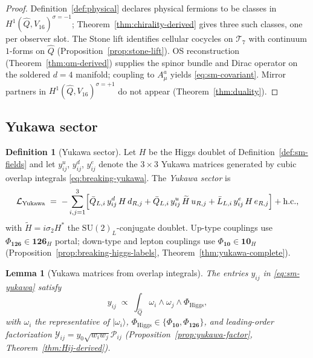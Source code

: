 \documentclass[11pt]{article}
\theoremstyle{plain}
\newtheorem{lemma}[theorem]{Lemma}
\theoremstyle{definition}
\newtheorem{definition}[theorem]{Definition}
\theoremstyle{remark}
\numberwithin{equation}{section}
\begin{document}
\begin{proof}
Definition~\ref{def:physical} declares physical fermions to be classes in
$H^1(\hat Q,V_{16})^{\sigma=-1}$; Theorem~\ref{thm:chirality-derived} gives
three such classes, one per observer slot. The Stone lift identifies cellular
cocycles on $\mathcal{T}_7$ with continuum $1$-forms on $\hat Q$
(Proposition~\ref{prop:stone-lift}). OS reconstruction
(Theorem~\ref{thm:qm-derived}) supplies the spinor bundle and Dirac operator on
the soldered $d=4$ manifold; coupling to $A_\mu^a$ yields \eqref{eq:sm-covariant}.
Mirror partners in $H^1(\hat Q,V_{16})^{\sigma=+1}$ do not appear
(Theorem~\ref{thm:duality}).
\end{proof}

\subsection{Yukawa sector}
\label{sec:sm-lagrangian:yukawa}

\begin{definition}[Yukawa sector]\label{def:sm-yukawa}
Let $H$ be the Higgs doublet of Definition~\ref{def:sm-fields} and let
$y_{ij}^{u}$, $y_{ij}^{d}$, $y_{ij}^{e}$ denote the $3\times3$ Yukawa matrices
generated by cubic overlap integrals \eqref{eq:breaking-yukawa}. The
\emph{Yukawa sector} is
\begin{equation}\label{eq:sm-yukawa}
  \mathcal{L}_{\mathrm{Yukawa}}
  \;=\;
  -\sum_{i,j=1}^{3}
  \Bigl[
    \bar Q_{L,i}\,y_{ij}^{d}\,H\,d_{R,j}
    + \bar Q_{L,i}\,y_{ij}^{u}\,\widetilde{H}\,u_{R,j}
    + \bar L_{L,i}\,y_{ij}^{e}\,H\,e_{R,j}
  \Bigr]
  + \mathrm{h.c.},
\end{equation}
with $\widetilde{H}=i\sigma_2 H^*$ the $\mathrm{SU}(2)_L$-conjugate doublet.
Up-type couplings use $\Phi_{\mathbf{126}}\in\mathbf{126}_H$ portal;
down-type and lepton couplings use $\Phi_{\mathbf{10}}\in\mathbf{10}_H$
(Proposition~\ref{prop:breaking-higgs-labels}, Theorem~\ref{thm:yukawa-complete}).
\end{definition}

\begin{lemma}[Yukawa matrices from overlap integrals]
\label{lem:sm-yukawa-derived}
The entries $y_{ij}$ in \eqref{eq:sm-yukawa} satisfy
\begin{equation}\label{eq:sm-yukawa-overlap}
  y_{ij}
  \;\propto\;
  \int_{\hat Q}\omega_i\wedge\omega_j\wedge\Phi_{\mathrm{Higgs}},
\end{equation}
with $\omega_i$ the representative of $|\omega_i\rangle$,
$\Phi_{\mathrm{Higgs}}\in\{\Phi_{\mathbf{10}},\Phi_{\mathbf{126}}\}$, and
leading-order factorization
$\mathcal{Y}_{ij}=y_0\sqrt{w_iw_j}\mathcal{P}_{ij}$
(Proposition~\ref{prop:yukawa-factor}, Theorem~\ref{thm:Hij-derived}).
\end{lemma}
\end{document}
